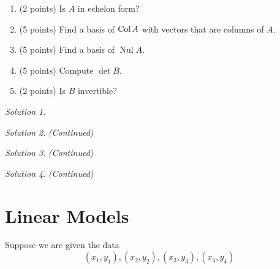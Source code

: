 \documentclass{article}
\theoremstyle{remark} \newtheorem*{solution}{Solution}
\DeclareMathOperator{\nul}{Nul} \DeclareMathOperator{\rank}{rank}
\begin{document}
\begin{enumerate}
\item (2 points) Is $A$ in echelon form?
\item (5 points) Find a basis of $\operatorname{Col} A$ with vectors that are
  columns of $A$.
\item (5 points) Find a basis of $\nul A$.
\item (5 points) Compute $\det B$.
\item (2 points) Is $B$ invertible?
\end{enumerate}
\medskip

\begin{solution}
\end{solution}

\pagebreak
\begin{solution}
  \textit{(Continued)}
\end{solution}

\pagebreak
\begin{solution}
  \textit{(Continued)}
\end{solution}

\pagebreak
\begin{solution}
  \textit{(Continued)}
\end{solution}

\pagebreak
\section{Linear Models}

Suppose we are given the data
\begin{displaymath}
  (x_1, y_1), (x_2, y_2), (x_3, y_3), (x_4, y_4)
\end{displaymath}
\end{document}
